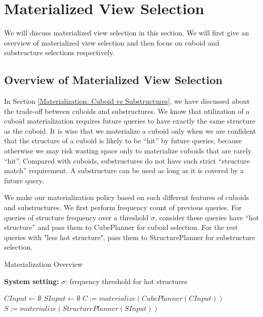 \section{Materialized View Selection}
\label{Materialization Part}
We will discuss materialized view selection in this section. We will first give an overview of materialized view selection and then focus on cuboid and substructure selections respectively.
\subsection{Overview of Materialized View Selection}
\label{Overview of Materialization Part}
In Section \ref{Materialization: Cuboid vs Substructures}, we have discussed about the trade-off between cuboids and substructures. We know that utilization of a cuboid materialization requires future queries to have exactly the same structure as the cuboid. It is wise that we materialize a cuboid only when we are confident that the structure of a cuboid is likely to be ``hit'' by future queries, because otherwise we may risk wasting space only to materialize cuboids that are rarely ``hit''. Compared with cuboids, substructures do not have such strict ``structure match'' requirement. A substructure can be used as long as it is covered by a future query. 

We make our materialization policy based on such different features of cuboids and substructures. 
We first perform frequency count of previous queries. For queries of structure frequency over a threshold $\sigma$, consider these queries have ``hot structure'' and pass them to CubePlanner for cuboid selection. For the rest queries with "less hot structure", pass them to StructurePlanner for substructure selection. 

\begin{algorithm}[H]
\caption{Materialization Overview}
\LinesNumbered
\textbf{System setting:} $\sigma$: frequency threshold for hot structures\\ 

$CInput \gets \emptyset$\;
$SInput \gets \emptyset$\;
$C:=materialize(CubePlanner(CInput))$\;
$S:=materialize(StructurePlanner(SInput))$\;
\label{alg:PartialMaterialization}
\end{algorithm}
\clearpage

